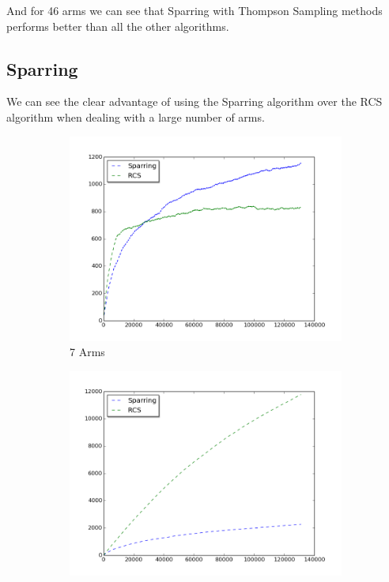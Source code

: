 \documentclass{llncs}
\begin{document}
And for 46 arms we can see that Sparring with Thompson Sampling methods performs better than all the other algorithms.


\subsection{Sparring}

We can see the clear advantage of using the Sparring algorithm over the RCS algorithm when dealing with a large number of arms.
\begin{figure}[h!]
\centering
\begin{subfigure}{.5\textwidth}
  \centering
  \includegraphics[scale=0.3, natwidth=410,natheight=442]{figures/rcs_sparring_MQ2007_7arms.png}
  \caption{7 Arms}
  \label{fig:sub1}
\end{subfigure}%
\begin{subfigure}{.5\textwidth}
  \centering
  \includegraphics[scale=0.3, natwidth=410,natheight=442]{figures/rcs_sparring_MQ2007_16arms.png}

\end{subfigure}
\end{figure}
\end{document}
